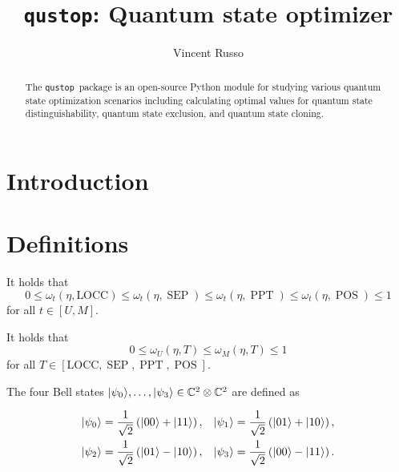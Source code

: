 \documentclass[11pt]{article}
\theoremstyle{definition}
\newcommand{\microspace}{\mspace{0.5mu}}
\newcommand{\POS}{\operatorname{POS}}
\newcommand{\PPT}{\operatorname{PPT}}
\newcommand{\SEP}{\operatorname{SEP}}
\newcommand{\ket}[1]{
  \lvert\microspace #1 \microspace \rangle}
\newcommand{\complex}{\mathbb{C}}
\newcommand{\qustop}{\texttt{qustop}}
\newcommand{\LOCC}{\text{LOCC}}
\begin{document}
\title{\LARGE\bf \qustop: Quantum state optimizer}

\author[1]{Vincent Russo}
  
\renewcommand\Affilfont{\normalsize\itshape}
\renewcommand\Authfont{\large}
\setlength{\affilsep}{6mm}
\renewcommand\Authand{\rule{10mm}{0mm}}

\maketitle

\begin{abstract}
    The \qustop\ package is an open-source Python module for studying various
    quantum state optimization scenarios including calculating optimal values
    for quantum state distinguishability, quantum state exclusion, and quantum
    state cloning.
\end{abstract}

\section{Introduction}
\label{sec:intro}

\section{Definitions}
\label{sec:definitions}

It holds that
\begin{equation}
    0 \leq \omega_t(\eta, \LOCC) \leq \omega_t(\eta, \SEP) \leq \omega_t(\eta, \PPT) \leq \omega_t(\eta, \POS) \leq 1
\end{equation}
for all $t \in [U, M]$.

It holds that
\begin{equation}
    0 \leq \omega_U(\eta, T) \leq \omega_M(\eta, T) \leq 1
\end{equation}
for all $T \in [\LOCC, \SEP, \PPT, \POS]$.

The four Bell states $\ket{\psi_0}, \ldots, \ket{\psi_3} \in \complex^2 \otimes
\complex^2$ are defined as

\begin{equation}
    \begin{aligned}
        \ket{\psi_0} = \frac{1}{\sqrt{2}} \left(\ket{00} + \ket{11} \right), &\quad
        \ket{\psi_1} = \frac{1}{\sqrt{2}} \left(\ket{01} + \ket{10} \right), \\
        \ket{\psi_2} = \frac{1}{\sqrt{2}} \left(\ket{01} - \ket{10} \right), &\quad
        \ket{\psi_3} = \frac{1}{\sqrt{2}} \left(\ket{00} - \ket{11} \right).
    \end{aligned}
\end{equation}
\end{document}
